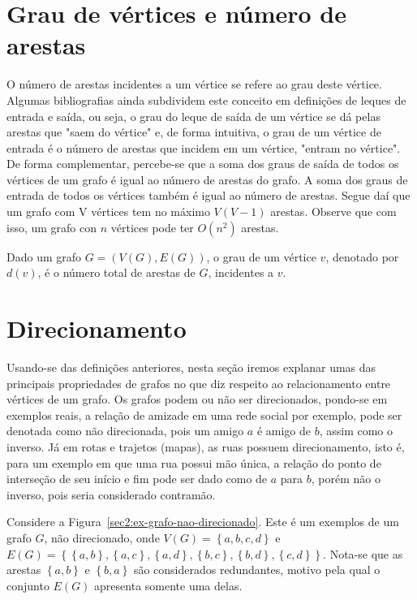 \section{Grau de vértices e número de arestas}
O número de arestas incidentes a um vértice se refere ao grau deste vértice. Algumas bibliografias ainda subdividem este conceito em definições de leques de entrada e saída, ou seja, o grau do leque de saída de um vértice se dá pelas arestas que "saem do vértice" e, de forma intuitiva, o grau de um vértice de entrada é o número de arestas que incidem em um vértice, "entram no vértice". De forma complementar, percebe-se que a soma dos graus de saída de todos os vértices de um grafo é igual ao número de arestas do grafo. A soma dos graus de entrada de todos os vértices também é igual ao número de arestas. Segue daí que um grafo com V vértices tem no máximo \begin{math}V (V - 1)\end{math} arestas. Observe que com isso, um grafo con $n$ vértices pode ter $O(n^2)$ arestas.

\begin{definition}
    Dado um grafo $G = (V(G), E(G))$, o grau de um vértice $v$, denotado por $d(v)$, é o número total de arestas de $G$, incidentes a $v$.
\end{definition}

\section{Direcionamento}
Usando-se das definições anteriores, nesta seção iremos explanar umas das principais propriedades de grafos no que diz respeito ao relacionamento entre vértices de um grafo. Os grafos podem ou não ser direcionados, pondo-se em exemplos reais, a relação de amizade em uma rede social por exemplo, pode ser denotada como não direcionada, pois um amigo $a$ é amigo de $b$, assim como o inverso. Já em rotas e trajetos (mapas), as ruas possuem direcionamento, isto é, para um exemplo em que uma rua possui mão única, a relação do ponto de interseção de seu início e fim pode ser dado como de $a$ para $b$, porém não o inverso, pois seria considerado contramão.

Considere a Figura~\ref{sec2:ex-grafo-nao-direcionado}. Este é um exemplos de um grafo $G$, não direcionado, onde $V(G) = \left\{a, b, c, d\right\} $ e $E(G) = \left\{\left\{a, b\right\}, \left\{a, c\right\}, \left\{a, d\right\}, \left\{b, c\right\}, \left\{b, d\right\}, \left\{c, d\right\}\right\}$. Nota-se que as arestas $\left\{a, b\right\} $ e $\left\{b, a\right\} $ são considerados redundantes, motivo pela qual o conjunto $E(G)$ apresenta somente uma delas.

